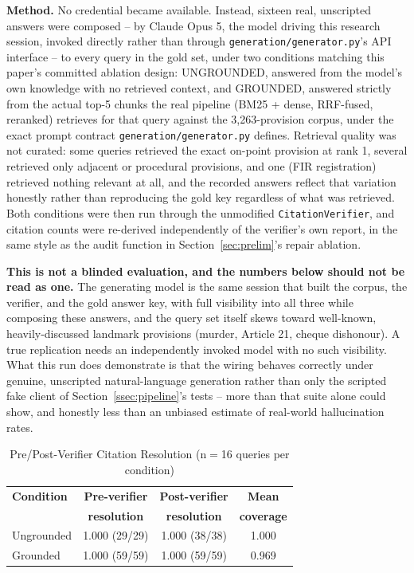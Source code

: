 \documentclass[conference]{IEEEtran}
\begin{document}
\textbf{Method.} No credential became available. Instead, sixteen real,
unscripted answers were composed -- by Claude Opus 5, the model driving this
research session, invoked directly rather than through
\texttt{generation/generator.py}'s API interface -- to every query in the
gold set, under two conditions matching this paper's committed ablation
design: UNGROUNDED, answered from the model's own knowledge with no retrieved
context, and GROUNDED, answered strictly from the actual top-5 chunks the
real pipeline (BM25 + dense, RRF-fused, reranked) retrieves for that query
against the 3{,}263-provision corpus, under the exact prompt contract
\texttt{generation/generator.py} defines. Retrieval quality was not curated:
some queries retrieved the exact on-point provision at rank 1, several
retrieved only adjacent or procedural provisions, and one (FIR registration)
retrieved nothing relevant at all, and the recorded answers reflect that
variation honestly rather than reproducing the gold key regardless of what
was retrieved. Both conditions were then run through the unmodified
\texttt{CitationVerifier}, and citation counts were re-derived independently
of the verifier's own report, in the same style as the audit function in
Section~\ref{sec:prelim}'s repair ablation.

\textbf{This is not a blinded evaluation, and the numbers below should not be
read as one.} The generating model is the same session that built the
corpus, the verifier, and the gold answer key, with full visibility into all
three while composing these answers, and the query set itself skews toward
well-known, heavily-discussed landmark provisions (murder, Article 21, cheque
dishonour). A true replication needs an independently invoked model with no
such visibility. What this run does demonstrate is that the wiring behaves
correctly under genuine, unscripted natural-language generation rather than
only the scripted fake client of Section~\ref{ssec:pipeline}'s tests -- more
than that suite alone could show, and honestly less than an unbiased estimate
of real-world hallucination rates.

\begin{table}[t]
\caption{Pre/Post-Verifier Citation Resolution (n$=$16 queries per condition)}
\label{tab:generation}
\centering
\footnotesize
\begin{tabular}{@{}lccc@{}}
\toprule
\textbf{Condition} & \textbf{Pre-verifier} & \textbf{Post-verifier} & \textbf{Mean} \\
                   & \textbf{resolution}   & \textbf{resolution}    & \textbf{coverage} \\
\midrule
Ungrounded & 1.000 (29/29) & 1.000 (38/38) & 1.000 \\
Grounded   & 1.000 (59/59) & 1.000 (59/59) & 0.969 \\
\bottomrule
\end{tabular}
\end{table}
\end{document}
